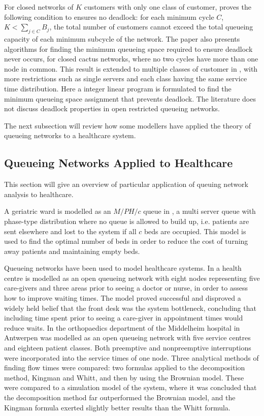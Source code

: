 \documentclass{article}
\begin{document}
For closed networks of $K$ customers with only one class of customer, \cite{kunduakyildiz89} proves the following condition to ensures no deadlock: for each minimum cycle $C$, $K < \sum_{j\in C} B_j$, the total number of customers cannot exceed the total queueing capacity of each minimum subcycle of the network.
The paper also presents algorithms for finding the minimum queueing space required to ensure deadlock never occurs, for closed cactus networks, where no two cycles have more than one node in common.
This result is extended to multiple classes of customer in \cite{liebeherrakyildiz95}, with more restrictions such as single servers and each class having the same service time distribution.
Here a integer linear program is formulated to find the minimum queueing space assignment that prevents deadlock.
The literature does not discuss deadlock properties in open restricted queueing networks.

The next subsection will review how some modellers have applied the theory of queueing networks to a healthcare system.


\subsection{Queueing Networks Applied to Healthcare}

This section will give an overview of particular application of queuing network
analysis to healthcare.

A geriatric ward is modelled as an $M/PH/c$ queue in \cite{gorunescuetal02}, a multi server queue with phase-type distribution where no queue is allowed to build up, i.e. patients are sent elsewhere and lost to the system if all $c$ beds are occupied.
This model is used to find the optimal number of beds in order to reduce the cost of turning away patients and maintaining empty beds.

Queueing networks have been used to model healthcare systems.
In \cite{albinetal90} a health centre is modelled as an open queueing network with eight nodes representing five care-givers and three areas prior to seeing a doctor or nurse, in order to assess how to improve waiting times.
The model proved successful and disproved a widely held belief that the front desk was the system bottleneck, concluding that including time spent prior to seeing a care-giver in appointment times would reduce waits.
In \cite{creemerslambrecht07} the orthopaedics department of the Middelheim hospital in Antwerpen was modelled as an open queueing network with five service centres and eighteen patient classes.
Both preemptive and nonpreemptive interruptions were incorporated into the service times of one node.
Three analytical methods of finding flow times were compared: two formulas applied to the decomposition method, Kingman and Whitt, and then by using the Brownian model.
These were compared to a simulation model of the system, where it was concluded that the decomposition method far outperformed the Brownian model, and the Kingman formula exerted slightly better results than the Whitt formula.
\end{document}

